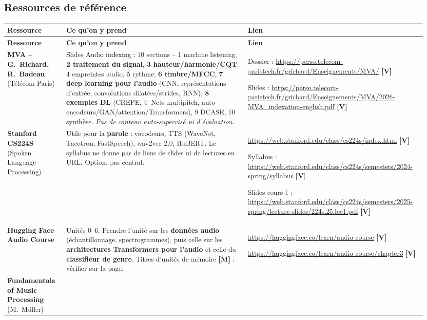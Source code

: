 \documentclass[11pt,a4paper]{article}
\providecommand{\og}{\guillemotleft\nobreakspace}%
\providecommand{\fg}{\nobreakspace\guillemotright}}
\newcommand{\lV}{\textbf{\textcolor{green!45!black}{[V]}}}
\newcommand{\lM}{\textbf{\textcolor{red!70!black}{[M]}}}
\begin{document}
\subsection{Ressources de référence}
{\footnotesize
\begin{longtable}{L{2.9cm}L{7.3cm}L{5.1cm}}
\toprule
\textbf{Ressource} & \textbf{Ce qu'on y prend} & \textbf{Lien}\\
\midrule
\endfirsthead
\toprule
\textbf{Ressource} & \textbf{Ce qu'on y prend} & \textbf{Lien}\\
\midrule
\endhead
\bottomrule
\endfoot
\textbf{MVA -- G.\ Richard, R.\ Badeau} (Télécom Paris) &
Slides \og{}Audio indexing\fg{} : 10 sections -- 1 machine listening, \textbf{2 traitement du signal}, \textbf{3 hauteur/harmonie/CQT}, 4 empreintes audio, 5 rythme, \textbf{6 timbre/MFCC}, \textbf{7 deep learning pour l'audio} (CNN, représentations d'entrée, convolutions dilatées/strides, RNN), \textbf{8 exemples DL} (CREPE, U-Nets multipitch, auto-encodeurs/GAN/attention/Transformers), 9 DCASE, 10 synthèse. \emph{Pas de contenu auto-supervisé ni d'évaluation.} &
Dossier : \url{https://perso.telecom-paristech.fr/grichard/Enseignements/MVA/} \lV\par Slides : \url{https://perso.telecom-paristech.fr/grichard/Enseignements/MVA/2026-MVA_indexation-english.pdf} \lV\\
\addlinespace
\textbf{Stanford CS224S} (Spoken Language Processing) &
Utile pour la \textbf{parole} : vocodeurs, TTS (WaveNet, Tacotron, FastSpeech), wav2vec 2.0, HuBERT. Le syllabus ne donne pas de liens de slides ni de lectures en URL. Option, pas central. &
\url{https://web.stanford.edu/class/cs224s/index.html} \lV\par Syllabus : \url{https://web.stanford.edu/class/cs224s/semesters/2024-spring/syllabus} \lV\par Slides cours 1 : \url{https://web.stanford.edu/class/cs224s/semesters/2025-spring/lecture-slides/224s.25.lec1.pdf} \lV\\
\addlinespace
\textbf{Hugging Face Audio Course} &
Unités 0--6. Prendre l'unité sur les \textbf{données audio} (échantillonnage, spectrogrammes), puis celle sur les \textbf{architectures Transformers pour l'audio} et celle du \textbf{classifieur de genre}. Titres d'unités de mémoire \lM{} : vérifier sur la page. &
\url{https://huggingface.co/learn/audio-course} \lV\par \url{https://huggingface.co/learn/audio-course/chapter3} \lV\\
\addlinespace
\textbf{Fundamentals of Music Processing} (M.\ Müller) &

\end{longtable}}
\end{document}
